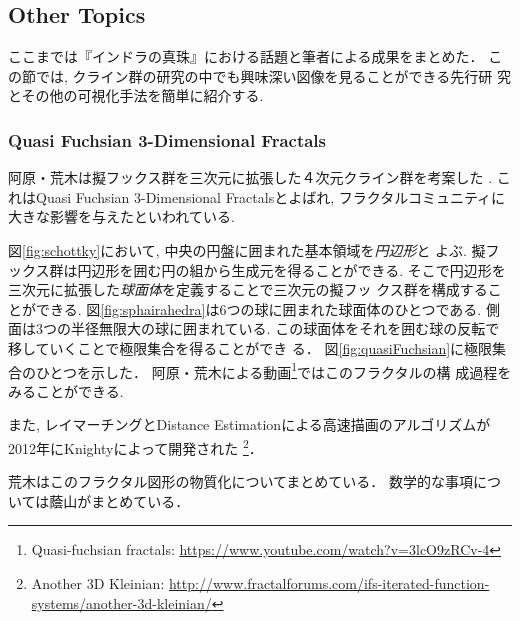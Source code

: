 \subsection{Other Topics}

ここまでは『インドラの真珠』における話題と筆者による成果をまとめた．
この節では, クライン群の研究の中でも興味深い図像を見ることができる先行研
究とその他の可視化手法を簡単に紹介する.

\subsubsection{Quasi Fuchsian 3-Dimensional Fractals}

阿原・荒木は擬フックス群を三次元に拡張した４次元クライン群を考案した
\cite{ahara2003sphairahedral}\cite{ahara2003sphaira}.
これはQuasi Fuchsian 3-Dimensional Fractalsとよばれ,
フラクタルコミュニティに大きな影響を与えたといわれている.

図\ref{fig:schottky}において, 中央の円盤に囲まれた基本領域を\emph{円辺形}と
よぶ.
擬フックス群は円辺形を囲む円の組から生成元を得ることができる.
そこで円辺形を三次元に拡張した\emph{球面体}を定義することで三次元の擬フッ
クス群を構成することができる.
図\ref{fig:sphairahedra}は6つの球に囲まれた球面体のひとつである.
側面は3つの半径無限大の球に囲まれている.
この球面体をそれを囲む球の反転で移していくことで極限集合を得ることができ
る．
図\ref{fig:quasiFuchsian}に極限集合のひとつを示した．
阿原・荒木による動画\footnote{Quasi-fuchsian fractals:
\url{https://www.youtube.com/watch?v=3lcO9zRCv-4}}ではこのフラクタルの構
成過程をみることができる.

また, レイマーチングとDistance Estimationによる高速描画のアルゴリズムが
2012年にKnightyによって開発された
\footnote{Another 3D Kleinian:
 \url{http://www.fractalforums.com/ifs-iterated-function-systems/another-3d-kleinian/}}．

荒木はこのフラクタル図形の物質化についてまとめている\cite{araki2006materializing}．
数学的な事項については蔭山\cite{kageyama2016masterSphaira}がまとめている．

